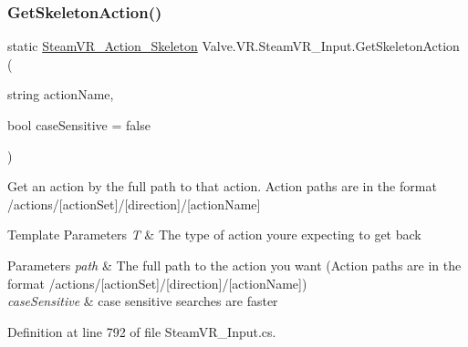 \mbox{\label{class_valve_1_1_v_r_1_1_steam_v_r___input_a55798ec9f2be11a482869809b315e825}} 
\subsubsection{\texorpdfstring{GetSkeletonAction()}{GetSkeletonAction()}\hspace{0.1cm}{\footnotesize\ttfamily [2/2]}}
{\footnotesize\ttfamily static \mbox{\hyperlink{class_valve_1_1_v_r_1_1_steam_v_r___action___skeleton}{Steam\+V\+R\+\_\+\+Action\+\_\+\+Skeleton}} Valve.\+V\+R.\+Steam\+V\+R\+\_\+\+Input.\+Get\+Skeleton\+Action (\begin{DoxyParamCaption}\item[{string}]{action\+Name,  }\item[{bool}]{case\+Sensitive = {\ttfamily false} }\end{DoxyParamCaption})\hspace{0.3cm}{\ttfamily [static]}}



Get an action by the full path to that action. Action paths are in the format /actions/\mbox{[}action\+Set\mbox{]}/\mbox{[}direction\mbox{]}/\mbox{[}action\+Name\mbox{]} 


\begin{DoxyTemplParams}{Template Parameters}
{\em T} & The type of action you\textquotesingle{}re expecting to get back\\
\hline
\end{DoxyTemplParams}

\begin{DoxyParams}{Parameters}
{\em path} & The full path to the action you want (Action paths are in the format /actions/\mbox{[}action\+Set\mbox{]}/\mbox{[}direction\mbox{]}/\mbox{[}action\+Name\mbox{]})\\
\hline
{\em case\+Sensitive} & case sensitive searches are faster\\
\hline
\end{DoxyParams}


Definition at line 792 of file Steam\+V\+R\+\_\+\+Input.\+cs.

\mbox{\label{class_valve_1_1_v_r_1_1_steam_v_r___input_a43955478497bd79185e2e990b1fe43d8}} 
